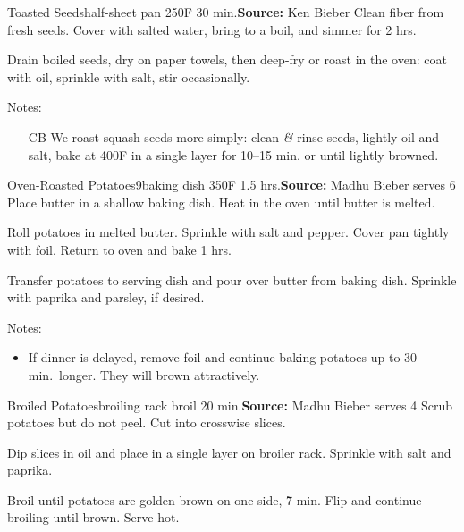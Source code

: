 \begin{recipe}{Toasted Seeds}{half-sheet pan \hfill 250\0F \hfill 30 min.}{\textbf{Source:} Ken Bieber \hfill }
 Clean fiber from fresh seeds. Cover with salted water, bring to a boil, and simmer for 2 hrs.

 \newstep Drain boiled seeds, dry on paper towels, then deep-fry or roast in the oven: coat with oil, sprinkle with salt, stir occasionally.

 \freeform Notes:
 \begin{itemize}
  \item [CB] We roast squash seeds more simply: clean \textit{\&} rinse seeds, lightly oil and salt, bake at 400\0F in a single layer for 10--15 min. or until lightly browned.
 \end{itemize}
\end{recipe}

\begin{recipe}{Oven-Roasted Potatoes}{9\inch{}\inch baking dish \hfill 350\0F \hfill 1.5 hrs.}{\textbf{Source:} Madhu Bieber \hfill serves 6}
 Place butter in a shallow baking dish. Heat in the oven until butter is melted.

 Roll potatoes in melted butter. Sprinkle with salt and pepper. Cover pan tightly with foil. Return to oven and bake 1 hrs.

 Transfer potatoes to serving dish and pour over butter from baking dish. Sprinkle with paprika and parsley, if desired.

 \freeform Notes:
 \begin{itemize}
  \item If dinner is delayed, remove foil and continue baking potatoes up to 30 min.\ longer. They will brown attractively.
 \end{itemize}
\end{recipe}

\begin{recipe}{Broiled Potatoes}{broiling rack \hfill broil \hfill 20 min.}{\textbf{Source:} Madhu Bieber \hfill serves 4}
 Scrub potatoes but do not peel. Cut into \inch crosswise slices.

 Dip slices in oil and place in a single layer on broiler rack. Sprinkle with salt and paprika.

 \newstep Broil until potatoes are golden brown on one side, \~7 min. Flip and continue broiling until brown. Serve hot.
\end{recipe}

